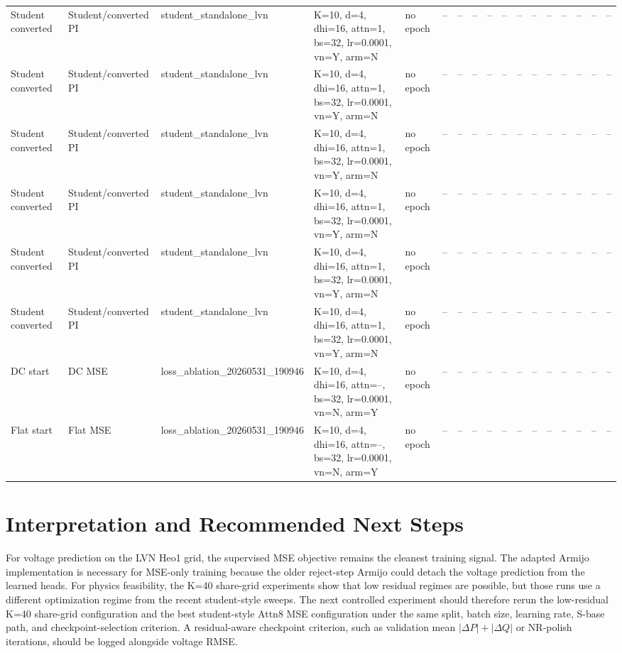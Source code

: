 \documentclass[10pt]{article}
\newcommand{\dP}{\Delta P}
\newcommand{\dQ}{\Delta Q}
\begin{document}
\begin{landscape}
\begin{longtable}{p{1.25cm}p{1.45cm}p{2.7cm}p{4.2cm}p{0.8cm}rrrrrrrrrrrr}
Student converted & Student/converted PI & student\_standalone\_lvn & K=10, d=4, dhi=16, attn=1, bs=32, lr=0.0001, vn=Y, arm=N & no epoch & -- & -- & -- & -- & -- & -- & -- & -- & -- & -- & -- & -- \\
Student converted & Student/converted PI & student\_standalone\_lvn & K=10, d=4, dhi=16, attn=1, bs=32, lr=0.0001, vn=Y, arm=N & no epoch & -- & -- & -- & -- & -- & -- & -- & -- & -- & -- & -- & -- \\
Student converted & Student/converted PI & student\_standalone\_lvn & K=10, d=4, dhi=16, attn=1, bs=32, lr=0.0001, vn=Y, arm=N & no epoch & -- & -- & -- & -- & -- & -- & -- & -- & -- & -- & -- & -- \\
Student converted & Student/converted PI & student\_standalone\_lvn & K=10, d=4, dhi=16, attn=1, bs=32, lr=0.0001, vn=Y, arm=N & no epoch & -- & -- & -- & -- & -- & -- & -- & -- & -- & -- & -- & -- \\
Student converted & Student/converted PI & student\_standalone\_lvn & K=10, d=4, dhi=16, attn=1, bs=32, lr=0.0001, vn=Y, arm=N & no epoch & -- & -- & -- & -- & -- & -- & -- & -- & -- & -- & -- & -- \\
Student converted & Student/converted PI & student\_standalone\_lvn & K=10, d=4, dhi=16, attn=1, bs=32, lr=0.0001, vn=Y, arm=N & no epoch & -- & -- & -- & -- & -- & -- & -- & -- & -- & -- & -- & -- \\
DC start & DC MSE & loss\_ablation\_20260531\_190946 & K=10, d=4, dhi=16, attn=--, bs=32, lr=0.0001, vn=N, arm=Y & no epoch & -- & -- & -- & -- & -- & -- & -- & -- & -- & -- & -- & -- \\
Flat start & Flat MSE & loss\_ablation\_20260531\_190946 & K=10, d=4, dhi=16, attn=--, bs=32, lr=0.0001, vn=N, arm=Y & no epoch & -- & -- & -- & -- & -- & -- & -- & -- & -- & -- & -- & -- \\
\bottomrule
\end{longtable}
\end{landscape}


\section{Interpretation and Recommended Next Steps}
For voltage prediction on the LVN Heo1 grid, the supervised MSE objective remains the cleanest training signal. The adapted Armijo implementation is necessary for MSE-only training because the older reject-step Armijo could detach the voltage prediction from the learned heads. For physics feasibility, the K=40 share-grid experiments show that low residual regimes are possible, but those runs use a different optimization regime from the recent student-style sweeps. The next controlled experiment should therefore rerun the low-residual K=40 share-grid configuration and the best student-style Attn8 MSE configuration under the same split, batch size, learning rate, S-base path, and checkpoint-selection criterion. A residual-aware checkpoint criterion, such as validation mean $|\dP|+|\dQ|$ or NR-polish iterations, should be logged alongside voltage RMSE.
\end{document}
